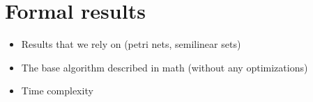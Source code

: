 \section{Formal results}
\label{sec:formal-results}

\begin{itemize}
	\item Results that we rely on (petri nets, semilinear sets)
	\item The base algorithm described in math (without any optimizations)
	\item Time complexity
\end{itemize}



